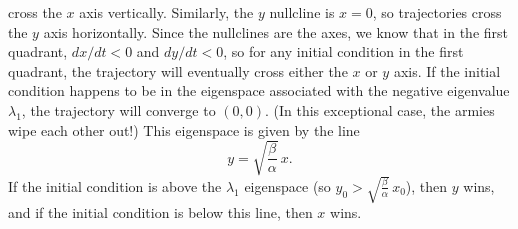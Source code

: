 \documentclass[reqno]{immbook}
\numberwithin{equation}{chapter}
\numberwithin{question}{section}
\numberwithin{theorem}{chapter}
\numberwithin{figure}{chapter}
\theoremstyle{definition}
\begin{document}
cross the $x$ axis vertically. Similarly, the $y$ nullcline is
$x=0$, so trajectories cross the $y$ axis horizontally.
Since the nullclines are the axes, we know that in the first
quadrant, $dx/dt < 0$ and $dy/dt < 0$, so for any initial
condition in the first quadrant, the trajectory will eventually
cross either the $x$ or $y$ axis. If the initial condition
happens to be in the eigenspace associated with the negative
eigenvalue $\lambda_1$, the trajectory will converge to
$(0,0)$. (In this exceptional case, the armies wipe each
other out!)
This eigenspace is given by the line
\begin{equation}
  y = \sqrt{\frac{\beta}{\alpha}}\, x.
\label{eqn:lanchester_eigenspace}
\end{equation}
If the initial condition is above the $\lambda_1$ eigenspace
(so $y_0 > \sqrt{\frac{\beta}{\alpha}}\, x_0$), then
$y$ wins, and if the initial condition is below this line,
then $x$ wins.
\end{document}
